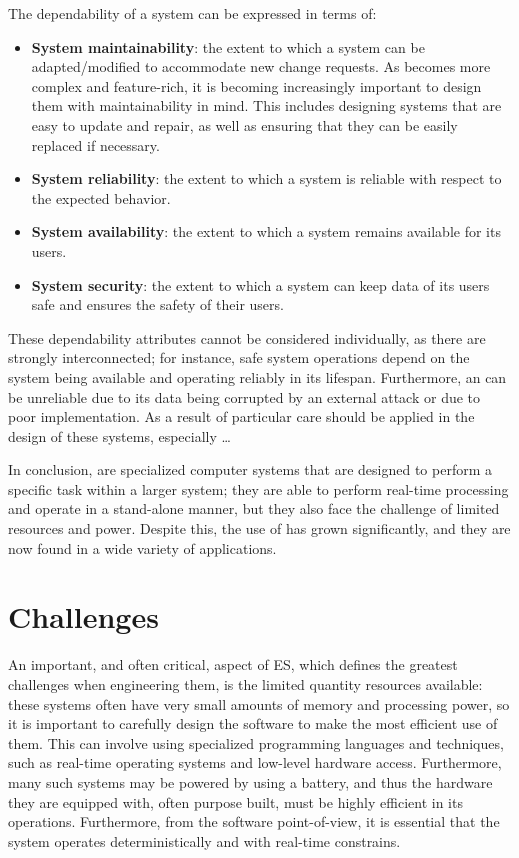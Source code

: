 The dependability of a system can be expressed in terms of:
\begin{itemize}
    \item \textbf{System maintainability}: the extent to which a system can be adapted/modified to accommodate new change requests. As \ess becomes more complex and feature-rich, it is becoming increasingly important to design them with maintainability in mind. This includes designing systems that are easy to update and repair, as well as ensuring that they can be easily replaced if necessary.
    \item \textbf{System reliability}: the extent to which a system is reliable with respect to the expected behavior.
    \item \textbf{System availability}: the extent to which a system remains available for its users.
    \item \textbf{System security}: the extent to which a system can keep data of its users safe and ensures the safety of their users.
\end{itemize}

These dependability attributes cannot be considered individually, as there are strongly interconnected; for instance, safe system operations depend on the system being available and operating reliably in its lifespan. Furthermore, an \es can be unreliable due to its data being corrupted by an external attack or due to poor implementation. As a result of particular care should be applied in the design of these systems, especially \dots 


In conclusion, \ess are specialized computer systems that are designed to perform a specific task within a larger system; they are able to perform real-time processing and operate in a stand-alone manner, but they also face the challenge of limited resources and power. Despite this, the use of \ess has grown significantly, and they are now found in a wide variety of applications.



\section {Challenges}
An important, and often critical, aspect of ES, which defines the greatest challenges when engineering them, is the limited quantity resources available: these systems often have very small amounts of memory and processing power, so it is important to carefully design the software to make the most efficient use of them. This can involve using specialized programming languages and techniques, such as real-time operating systems and low-level hardware access. Furthermore, many such systems may be powered by using a battery, and thus the hardware they are equipped with, often purpose built, must be highly efficient in its operations. Furthermore, from the software point-of-view, it is essential that the system operates deterministically and with real-time constrains.

